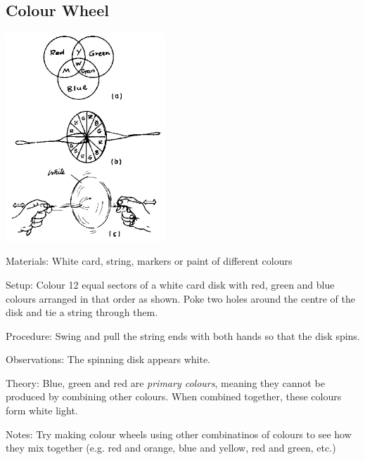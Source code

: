 \begin{multicols}{2}
\subsection{Colour Wheel}

\begin{center}
\includegraphics[width=0.45\textwidth]{./img/source/colour-wheel.png}
\end{center}

\begin{description*}
\item[Materials:]{White card, string, markers or paint of different colours}
\item[Setup:]{Colour 12 equal sectors of a white card disk with red, green and blue colours arranged in that order as shown. Poke two holes around the centre of the disk and tie a string through them.}
\item[Procedure:]{Swing and pull the string ends with both hands so that the disk spins.}
\item[Observations:]{The spinning disk appears white.}
\item[Theory:]{Blue, green and red are \emph{primary colours}, meaning they cannot be produced by combining other colours. When combined together, these colours form white light.}
\item[Notes:]{Try making colour wheels using other combinatinos of colours to see how they mix together (e.g. red and orange, blue and yellow, red and green, etc.)}
\end{description*}


\end{multicols}
